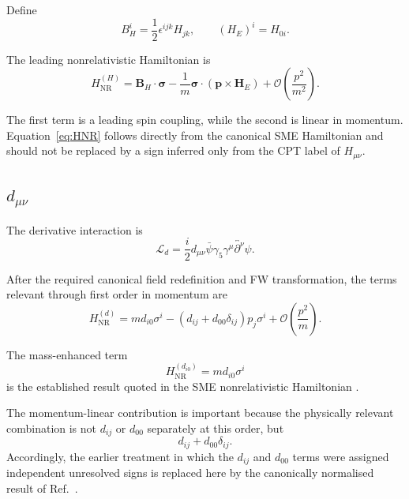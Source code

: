 \documentclass[aps,prd,reprint,superscriptaddress,nofootinbib]{revtex4-2}
\newcommand{\NR}{\mathrm{NR}}
\begin{document}
	Define
	\begin{equation}
		B_H^i
		=
		\frac12\epsilon^{ijk}H_{jk},
		\qquad
		(H_E)^i=H_{0i}.
	\end{equation}
	
	The leading nonrelativistic Hamiltonian is
	\begin{equation}
		H_{\NR}^{(H)}
		=
		\mathbf B_H\cdot\boldsymbol{\sigma}
		-\frac{1}{m}
		\boldsymbol{\sigma}\cdot
		(\mathbf p\times\mathbf H_E)
		+\mathcal O\!\left(\frac{p^2}{m^2}\right).
		\label{eq:HNR}
	\end{equation}
	
	The first term is a leading spin coupling, while the second is
	linear in momentum. Equation~\eqref{eq:HNR} follows directly from the
	canonical SME Hamiltonian and should not be replaced by a sign inferred
	only from the CPT label of $H_{\mu\nu}$.
	
	\subsection{$d_{\mu\nu}$}
	
	The derivative interaction is
	\begin{equation}
		\mathcal L_d
		=
		\frac{i}{2}
		d_{\mu\nu}
		\bar\psi\gamma_5\gamma^\mu
		\overleftrightarrow{\partial^\nu}\psi .
		\label{eq:Ld}
	\end{equation}
	
	After the required canonical field redefinition and FW transformation,
	the terms relevant through first order in momentum are
	\begin{equation}
		H_{\NR}^{(d)}
		=
		m d_{i0}\sigma^i
		-
		\left(
		d_{ij}+d_{00}\delta_{ij}
		\right)p_j\sigma^i
		+\mathcal O\!\left(\frac{p^2}{m}\right).
		\label{eq:dNR}
	\end{equation}
	
	The mass-enhanced term
	\begin{equation}
		H_{\NR}^{(d_{i0})}
		=
		m d_{i0}\sigma^i
		\label{eq:di0}
	\end{equation}
	is the established result quoted in the SME nonrelativistic
	Hamiltonian \cite{KosteleckyLane1999}.
	
	The momentum-linear contribution is important because the physically
	relevant combination is not $d_{ij}$ or $d_{00}$ separately at this
	order, but
	\begin{equation}
		d_{ij}+d_{00}\delta_{ij}.
		\label{eq:dcombination}
	\end{equation}
	Accordingly, the earlier treatment in which the $d_{ij}$ and $d_{00}$
	terms were assigned independent unresolved signs is replaced here by
	the canonically normalised result of Ref.~\cite{KosteleckyLane1999}.
	
\end{document}
